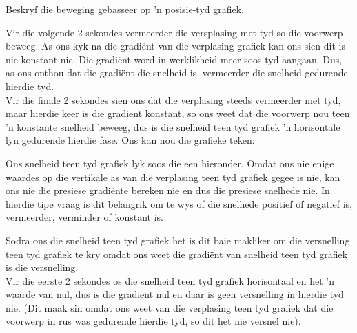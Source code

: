 \begin{wex}{Beskryf die beweging gebasseer op 'n posisie-tyd grafiek.}
{
Vir die volgende 2 sekondes vermeerder die versplasing met tyd so die voorwerp beweeg. As ons kyk na die gradi\"ent van die verplasing grafiek kan ons sien dit is nie konstant nie. Die gradi\"ent word in werklikheid meer soos tyd aangaan. Dus, as ons onthou dat die gradi\"ent die snelheid is, vermeerder die snelheid gedurende hierdie tyd. \\

Vir die finale 2 sekondes sien ons dat die verplasing steeds vermeerder met tyd, maar hierdie keer is die gradi\"ent konstant, so ons weet dat die voorwerp nou teen 'n konstante snelheid beweeg, dus is die snelheid teen tyd grafiek 'n horisontale lyn gedurende hierdie fase. Ons kan nou die grafieke teken:

Ons snelheid teen tyd grafiek lyk soos die een hieronder. Omdat ons nie enige waardes op die vertikale as van die verplasing teen tyd grafiek gegee is nie, kan ons nie die presiese gradi\"ente bereken nie en dus die presiese snelhede nie. In hierdie tipe vraag is dit belangrik om te wys of die snelhede positief of negatief is, vermeerder, verminder of konstant is.

\begin{center}
\end{center}

Sodra ons die snelheid teen tyd grafiek het is dit baie makliker om die versnelling teen tyd grafiek te kry omdat ons weet die gradi\"ent van snelheid teen tyd grafiek is die versnelling.\\

Vir die eerste 2 sekondes os die snelheid teen tyd grafiek horisontaal en het 'n waarde van nul, dus is die gradi\"ent nul en daar is geen versnelling in hierdie tyd nie. (Dit maak sin omdat ons weet van die verplasing teen tyd grafiek dat die voorwerp in rus was gedurende hierdie tyd, so dit het nie versnel nie).\\ 

}
\end{wex}
